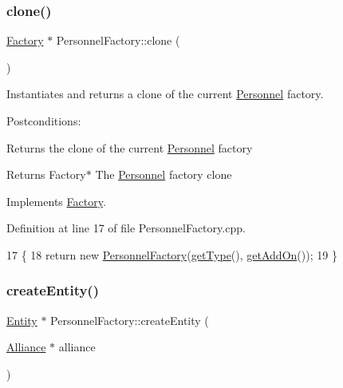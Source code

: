 \subsubsection{\texorpdfstring{clone()}{clone()}}
{\footnotesize\ttfamily \hyperlink{classFactory}{Factory} $\ast$ Personnel\+Factory\+::clone (\begin{DoxyParamCaption}{ }\end{DoxyParamCaption})\hspace{0.3cm}{\ttfamily [virtual]}}



Instantiates and returns a clone of the current \hyperlink{classPersonnel}{Personnel} factory. 

Postconditions\+:
\begin{DoxyItemize}
\item Returns the clone of the current \hyperlink{classPersonnel}{Personnel} factory
\end{DoxyItemize}

\begin{DoxyReturn}{Returns}
Factory$\ast$ The \hyperlink{classPersonnel}{Personnel} factory clone 
\end{DoxyReturn}


Implements \hyperlink{classFactory}{Factory}.



Definition at line 17 of file Personnel\+Factory.\+cpp.


\begin{DoxyCode}
17                                  \{
18     \textcolor{keywordflow}{return} \textcolor{keyword}{new} \hyperlink{classPersonnelFactory_a71cd406976230cacebfcfd723d2a2615}{PersonnelFactory}(\hyperlink{classFactory_ac91051006ace7ec5bb6ecf0fe6d02d58}{getType}(), \hyperlink{classFactory_a994153930f59cafb280e91d5b100b5aa}{getAddOn}());
19 \}
\end{DoxyCode}
\mbox{\label{classPersonnelFactory_ae8684c246d5dfb1f469f368525867394}} 
\subsubsection{\texorpdfstring{create\+Entity()}{createEntity()}}
{\footnotesize\ttfamily \hyperlink{classEntity}{Entity} $\ast$ Personnel\+Factory\+::create\+Entity (\begin{DoxyParamCaption}\item[{\hyperlink{classAlliance}{Alliance} $\ast$}]{alliance }\end{DoxyParamCaption})\hspace{0.3cm}{\ttfamily [virtual]}}




